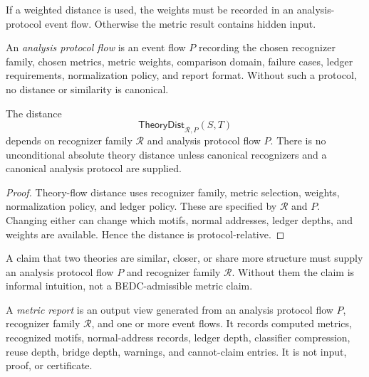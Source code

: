 \begin{remark}
\label{rem:metrics-weights-explicit}
If a weighted distance is used, the weights must be recorded in an analysis-protocol event flow. Otherwise the metric result contains hidden input.
\end{remark}

\begin{definition}
\label{def:metrics-analysis-protocol}
An \emph{analysis protocol flow} is an event flow $P$ recording the chosen recognizer family, chosen metrics, metric weights, comparison domain, failure cases, ledger requirements, normalization policy, and report format. Without such a protocol, no distance or similarity is canonical.
\end{definition}

\begin{theorem}
\label{thm:metrics-theory-distance-protocol-relative}
The distance
$$
  \mathsf{TheoryDist}_{\mathcal R,P}(S,T)
$$
depends on recognizer family $\mathcal R$ and analysis protocol flow $P$. There is no unconditional absolute theory distance unless canonical recognizers and a canonical analysis protocol are supplied.
\end{theorem}

\begin{proof}
Theory-flow distance uses recognizer family, metric selection, weights, normalization policy, and ledger policy. These are specified by $\mathcal R$ and $P$. Changing either can change which motifs, normal addresses, ledger depths, and weights are available. Hence the distance is protocol-relative.
\end{proof}

\begin{corollary}
\label{cor:metrics-similarity-requires-protocol}
A claim that two theories are similar, closer, or share more structure must supply an analysis protocol flow $P$ and recognizer family $\mathcal R$. Without them the claim is informal intuition, not a BEDC-admissible metric claim.
\end{corollary}

\begin{definition}
\label{def:metrics-report}
A \emph{metric report} is an output view generated from an analysis protocol flow $P$, recognizer family $\mathcal R$, and one or more event flows. It records computed metrics, recognized motifs, normal-address records, ledger depth, classifier compression, reuse depth, bridge depth, warnings, and cannot-claim entries. It is not input, proof, or certificate.
\end{definition}

